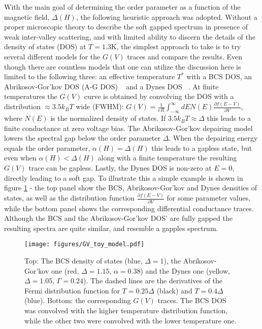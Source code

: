 \documentclass[showpacs,superscriptaddress,onecolumn,prb]{revtex4}
\begin{document}
With the main goal of determining the order parameter as a function of the magnetic field, $\Delta(H)$, the following heuristic approach was adopted.
Without a proper microscopic theory to describe the soft gapped spectrum in presence of weak inter-valley scattering, and with limited ability to discern the details of the density of states (DOS) at $T=1.3\mathrm{K}$, the simplest approach to take is to try several different models for the $G(V)$ traces and compare the results. Even though there are countless models that one can utilize the discussion here is limited to the following three: an effective temperature $T^*$ with a BCS DOS, an Abrikosov-Gor'kov DOS (A-G DOS)  ~\cite{AG_DOS}  and a Dynes DOS   ~\cite{Dynes_DOS}. At finite temperatures the $G(V)$ curve is obtained by convolving the DOS with a distribution $\approx 3.5k_B T$ wide (FWHM): \large{$G(V) = \frac{1}{eR} \int_{-\infty}^{\infty} dE N(E) \frac{\partial f(E-V)}{\partial V}$}\normalsize, where $N(E)$ is the normalized density of states.  If $3.5k_B T \approx \Delta$ this leads to a finite conductance at zero voltage bias. The Abrikosov-Gor'kov depairing model lowers the spectral gap below the order parameter $\Delta$. When the depairing energy equals the order parameter, $\alpha(H)=\Delta(H)$ this leads to a gapless state, but even when $\alpha(H)<\Delta(H)$  along with a finite temperature the resulting $G(V)$ trace can be gapless. Lastly, the Dynes DOS is non-zero at $E=0$, directly leading to a soft gap. To illustrate this a simple example is shown in figure \ref{fig:GV_toy_model} - the top panel show the BCS, Abrikosov-Gor'kov and Dynes densities of states, as well as the distribution function $\frac{\partial f(E-V)}{\partial V}$ for some parameter values, while the bottom panel shows the corresponding differential conductance traces. Although the BCS and the Abrikosov-Gor'kov DOS' are fully gapped the resulting spectra are quite similar, and resemble a gapples spectrum.

\begin{figure}[h]
	\centering
	\texttt{[image: figures/GV\_toy\_model.pdf]}
	\caption{Top: The BCS density of states (blue, $\Delta=1$), the Abrikosov-Gor'kov one (red, $\Delta=1.15$, $\alpha=0.38$) and the Dynes one (yellow, $\Delta=1.05$, $\Gamma=0.24$). The dashed lines are the derivatives of the Fermi distribution function for $T=0.25\Delta$ (black) and $T=0.4\Delta$ (blue). Bottom: the corresponding $G(V)$ traces. The BCS DOS was convolved with the higher temperature distribution function, while the other two were convolved with the lower temperature one.
	}
	\label{fig:GV_toy_model}
\end{figure}
\end{document}
